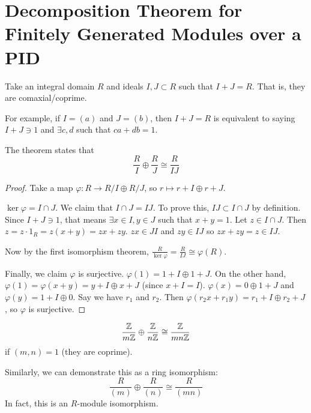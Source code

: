 \documentclass[a4paper,twoside,master.tex]{subfiles}
\begin{document}

\section{Decomposition Theorem for Finitely Generated Modules over a PID}\label{sec:decomposition_theorem_for_finitely_generated_modules_over_a_pid}

\begin{theorem}
    Take an integral domain $ R $ and ideals $ I,J\subset R $ such that $ I+J = R $. That is, they are comaxial/coprime.
    
    For example, if $ I = (a) $ and $ J = (b) $, then $ I+J = R $ is equivalent to saying $ I + J \ni 1 $ and $ \exists c,d $ such that $ c a + d b = 1 $. 

    The theorem states that
    \begin{equation}
        \frac{R}{I} \oplus \frac{R}{J} \cong \frac{R}{IJ}
    \end{equation}
\end{theorem}
\begin{proof}
    Take a map $ \varphi\colon R \to R/I \oplus R/J $, so $ r\mapsto r+I \oplus r+J $.

    $ \ker \varphi = I \cap J $. We claim that $ I\cap J = IJ $. To prove this, $ IJ\subset I \cap J $ by definition. Since $ I+J \ni 1 $, that means $ \exists x \in I, y \in J $ such that $ x + y = 1 $. Let $ z \in I \cap J $. Then $ z = z \cdot 1_R = z(x + y)= zx + zy $. $ zx \in JI $ and $ zy \in IJ $ so $ zx + zy = z \in IJ $.

    Now by the first isomorphism theorem, $ \frac{R}{\ker \varphi} = \frac{R}{IJ} \cong \varphi(R) $.

    Finally, we claim $ \varphi $ is surjective. $ \varphi(1) = 1 + I \oplus 1 + J $. On the other hand, $ \varphi(1) = \varphi(x + y) = y + I \oplus x + J $ (since $ x + I = I $). $ \varphi(x) = 0 \oplus 1 + J $ and $ \varphi(y) = 1 + I \oplus 0 $. Say we have $ r_1 $ and $ r_2 $. Then $ \varphi(r_2 x + r_1 y) = r_1 + I \oplus r_2 + J $, so $ \varphi $ is surjective.
\end{proof}

\begin{corollary}
    \begin{equation}
        \frac{\mathbb{Z}}{m\mathbb{Z}} \oplus \frac{\mathbb{Z}}{n\mathbb{Z}} \cong \frac{\mathbb{Z}}{mn\mathbb{Z}}
    \end{equation}
    if $ (m,n)=1 $ (they are coprime).
\end{corollary}
Similarly, we can demonstrate this as a ring isomorphism:
\begin{equation}
    \frac{R}{(m)} \oplus \frac{R}{(n)} \cong \frac{R}{(mn)}
\end{equation}
In fact, this is an $ R $-module isomorphism.
\end{document}
